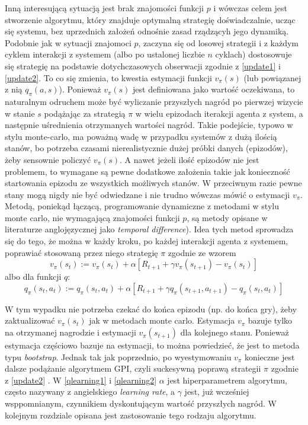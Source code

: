 \documentclass[licencjacka]{pracamgr}
\begin{document}
Inną interesującą sytuacją jest brak znajomości funkcji $p$ i wówczas celem jest stworzenie algorytmu, który znajduje optymalną strategię doświadczalnie, ucząc się systemu, bez uprzednich założeń odnośnie zasad rządzącyh  jego dynamiką.  Podobnie jak  w sytuacji znajomoci $p$,  zaczyna się od losowej strategii i z każdym cyklem interakcji z systemem (albo po ustalonej liczbie  $n$ cyklach) dostosowuje się strategię na podstawie dotychczasowych obserwacji zgodnie z \ref{update1} i \ref{update2}. To co się zmienia, to kwestia estymacji funkcji $v_{\pi}(s)$ (lub powiązanej z nią $q_{\pi}(a,s)$). Ponieważ $v_{\pi}(s)$ jest definiowana jako wartość oczekiwana, to naturalnym odruchem może być wyliczanie przyszłych nagród po pierwzej wizycie w stanie $s$ podążając za strategią $\pi$ w wielu epizodach iterakcji agenta z system, a następnie uśrednienia otrzymanych wartości nagród. Takie podejście, typowo w stylu monte-carlo, ma poważną wadę w przypadku systemów z dużą ilością stanów, bo potrzeba czasami nierealistycznie dużej próbki danych (epizodów), żeby sensownie policzyć  $v_{\pi}(s)$. A nawet jeżeli ilość epizodów nie jest problemem, to wymagane są pewne dodatkowe założenia takie jak konieczność startowania epizodu ze wszystkich możliwych stanów. W przeciwnym razie pewne stany mogą nigdy nie być odwiedzane i nie trudno wówczas mówić o estymacji $v_{\pi}$.  \\
 
 Metodą, poniekąd łączącą, programowanie dynamiczne z metodami w stylu monte carlo, nie wymagającą znajomości funkcji $p$, są metody opisane w literaturze anglojęzycznej jako \textit{temporal difference}).  Idea tych metod sprowadza się do tego, że można w każdy kroku, po każdej interakcji agenta z systemem, poprawiać stosowaną przez niego strategię $\pi$ zgodnie ze wzorem
\begin{equation}\label{qlearning1}
   v_{\pi}(s_{t}) := v_{\pi}(s_{t}) +\alpha [R_{t+1} + \gamma v_{\pi}(s_{t+1}) - v_{\pi}(s_{t})]
 \end{equation}
 albo dla funkcji $q$:
\begin{equation}\label{qlearning2}
   q_{\pi}(s_{t}, a_{t}) := q_{\pi}(s_{t},a_{t}) +\alpha [R_{t+1} + \gamma q_{\pi}(s_{t+1}, a_{t+1}) - q_{\pi}(s_{t},a_{t})]
 \end{equation}
 
 W tym wypadku nie potrzeba czekać do końca epizodu (np. do końca gry), żeby zaktualizować $v_{\pi}(s_{t})$ jak w metodach monte carlo. Estymacja $v_{\pi}$  bazuje tylko na otrzymanej nagrodzie i estymacji $v_{\pi}(s_{t+1})$ dla kolejnego stanu. Ponieważ estymacja częściowo bazuje na estymacji, to można powiedzieć, że jest to metoda typu \textit{bootstrap}. Jednak tak jak poprzednio, po wyestymowaniu $v_{\pi}$ konieczne jest dalsze podążanie algorytmem GPI, czyli suckesywną poprawą strategii $\pi$ zgodnie z \ref{update2} .   W \ref{qlearning1} i \ref{qlearning2}  $\alpha$ jest hiperparametrem algorytmu, często nazywany z angielskiego \textit{learning rate}, a $\gamma$ jest, już wcześniej wsppomnianym, czynnikiem dyskontującym wartość przyszłych nagród. W kolejnym rozdziale opisana jest zastosowanie tego rodzaju algorytmu. \\
 
\end{document}
